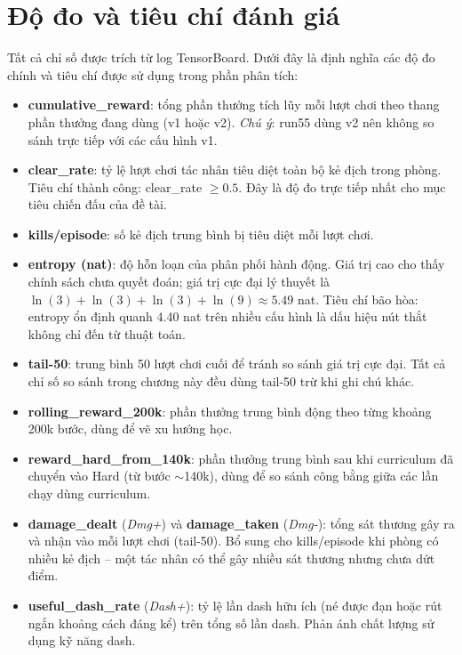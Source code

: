 \section{Độ đo và tiêu chí đánh giá}
\label{sec:eval_metrics}

Tất cả chỉ số được trích từ log TensorBoard. Dưới đây là định nghĩa các độ đo chính và tiêu chí được sử dụng trong phần phân tích:

\begin{itemize}
    \item \textbf{cumulative\_reward}: tổng phần thưởng tích lũy mỗi lượt chơi theo thang phần thưởng đang dùng (v1 hoặc v2). \textit{Chú ý}: run55 dùng v2 nên không so sánh trực tiếp với các cấu hình v1.
    \item \textbf{clear\_rate}: tỷ lệ lượt chơi tác nhân tiêu diệt toàn bộ kẻ địch trong phòng. Tiêu chí thành công: clear\_rate $\geq 0.5$. Đây là độ đo trực tiếp nhất cho mục tiêu chiến đấu của đề tài.
    \item \textbf{kills/episode}: số kẻ địch trung bình bị tiêu diệt mỗi lượt chơi.
    \item \textbf{entropy (nat)}: độ hỗn loạn của phân phối hành động. Giá trị cao cho thấy chính sách chưa quyết đoán; giá trị cực đại lý thuyết là $\ln(3)+\ln(3)+\ln(3)+\ln(9) \approx 5.49$ nat. Tiêu chí bão hòa: entropy ổn định quanh 4.40 nat trên nhiều cấu hình là dấu hiệu nút thắt không chỉ đến từ thuật toán.
    \item \textbf{tail-50}: trung bình 50 lượt chơi cuối để tránh so sánh giá trị cực đại. Tất cả chỉ số so sánh trong chương này đều dùng tail-50 trừ khi ghi chú khác.
    \item \textbf{rolling\_reward\_200k}: phần thưởng trung bình động theo từng khoảng 200k bước, dùng để vẽ xu hướng học.
    \item \textbf{reward\_hard\_from\_140k}: phần thưởng trung bình sau khi curriculum đã chuyển vào Hard (từ bước $\sim$140k), dùng để so sánh công bằng giữa các lần chạy dùng curriculum.
    \item \textbf{damage\_dealt} (\textit{Dmg+}) và \textbf{damage\_taken} (\textit{Dmg-}): tổng sát thương gây ra và nhận vào mỗi lượt chơi (tail-50). Bổ sung cho kills/episode khi phòng có nhiều kẻ địch -- một tác nhân có thể gây nhiều sát thương nhưng chưa dứt điểm.
    \item \textbf{useful\_dash\_rate} (\textit{Dash+}): tỷ lệ lần dash hữu ích (né được đạn hoặc rút ngắn khoảng cách đáng kể) trên tổng số lần dash. Phản ánh chất lượng sử dụng kỹ năng dash.

\end{itemize}
